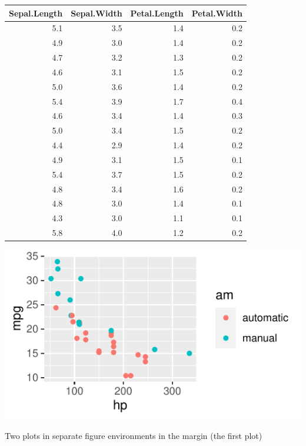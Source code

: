 \documentclass[
  letterpaper,
  DIV=11,
  numbers=noendperiod,
  oneside]{scrartcl}
\begin{document}
\begin{longtable}[]{@{}rrrr@{}}
\toprule()
Sepal.Length & Sepal.Width & Petal.Length & Petal.Width \\
\midrule()
\endhead
5.1 & 3.5 & 1.4 & 0.2 \\
4.9 & 3.0 & 1.4 & 0.2 \\
4.7 & 3.2 & 1.3 & 0.2 \\
4.6 & 3.1 & 1.5 & 0.2 \\
5.0 & 3.6 & 1.4 & 0.2 \\
5.4 & 3.9 & 1.7 & 0.4 \\
4.6 & 3.4 & 1.4 & 0.3 \\
5.0 & 3.4 & 1.5 & 0.2 \\
4.4 & 2.9 & 1.4 & 0.2 \\
4.9 & 3.1 & 1.5 & 0.1 \\
5.4 & 3.7 & 1.5 & 0.2 \\
4.8 & 3.4 & 1.6 & 0.2 \\
4.8 & 3.0 & 1.4 & 0.1 \\
4.3 & 3.0 & 1.1 & 0.1 \\
5.8 & 4.0 & 1.2 & 0.2 \\
\bottomrule()
\end{longtable}

\begin{marginfigure}

{\centering \includegraphics{cv_files/figure-pdf/fig-margin-separate-a-1.pdf}

}

\caption{\label{fig-margin-separate-a-1}Two plots in separate figure
environments in the margin (the first plot)}

\end{marginfigure}
\end{document}
